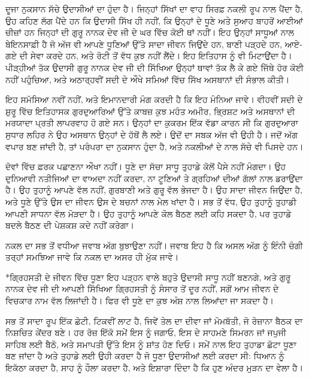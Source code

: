 \documentclass[12pt,a5paper,twoside]{book}  %
\makeatletter
\renewcommand\section{\@startsection{section}{1}{0pt}{1.2em}{0.6em}{\punjabifont\Large\bfseries}}%
\makeatother
\begin{document}
{ਦੂਜਾ ਨੁਕਸਾਨ ਸੱਚੇ ਉਦਾਸੀਆਂ ਦਾ ਹੁੰਦਾ ਹੈ। ਜਿਨ੍ਹਾਂ ਸਿੱਖਾਂ ਦਾ ਵਾਹ ਸਿਰਫ਼ ਨਕਲੀ ਰੂਪ ਨਾਲ ਪੈਂਦਾ ਹੈ, ਉਹ ਕਹਿਣ ਲੱਗ ਪੈਂਦੇ ਹਨ ਕਿ ਉਦਾਸੀ ਸਿੱਖ ਹੀ ਨਹੀਂ, ਕਿ ਉਨ੍ਹਾਂ ਦੇ ਧੂਣੇ ਅਤੇ ਸੁਆਹ ਬਾਹਰੋਂ ਆਈਆਂ ਚੀਜ਼ਾਂ ਹਨ ਜਿਨ੍ਹਾਂ ਦੀ ਗੁਰੂ ਨਾਨਕ ਦੇਵ ਜੀ ਦੇ ਘਰ ਵਿੱਚ ਕੋਈ ਥਾਂ ਨਹੀਂ। ਇਹ ਉਨ੍ਹਾਂ ਸਾਧੂਆਂ ਨਾਲ ਬੇਇਨਸਾਫ਼ੀ ਹੈ ਜੋ ਅੱਜ ਵੀ ਆਪਣੇ ਧੂਣਿਆਂ ਉੱਤੇ ਸਾਦਾ ਜੀਵਨ ਜਿਉਂਦੇ ਹਨ, ਬਾਣੀ ਪੜ੍ਹਦੇ ਹਨ, ਆਏ-ਗਏ ਦੀ ਸੇਵਾ ਕਰਦੇ ਹਨ, ਅਤੇ ਰੋਟੀ ਤੋਂ ਵੱਧ ਕੁਝ ਨਹੀਂ ਲੈਂਦੇ। ਇਹ ਇਤਿਹਾਸ ਨੂੰ ਵੀ ਮਿਟਾਉਂਦਾ ਹੈ। ਪੀੜ੍ਹੀਆਂ ਤੱਕ ਉਦਾਸੀ ਗੁਰੂ ਨਾਨਕ ਦੇਵ ਜੀ ਦੀ ਸਿੱਖਿਆ ਉਨ੍ਹਾਂ ਥਾਵਾਂ ਤੱਕ ਲੈ ਕੇ ਗਏ ਜਿੱਥੇ ਹੋਰ ਕੋਈ ਨਹੀਂ ਪਹੁੰਚਿਆ, ਅਤੇ ਅਠਾਰ੍ਹਵੀਂ ਸਦੀ ਦੇ ਔਖੇ ਸਮਿਆਂ ਵਿੱਚ ਸਿੱਖ ਅਸਥਾਨਾਂ ਦੀ ਸੰਭਾਲ ਕੀਤੀ।

ਇਹ ਸਮੱਸਿਆ ਨਵੀਂ ਨਹੀਂ, ਅਤੇ ਇਮਾਨਦਾਰੀ ਮੰਗ ਕਰਦੀ ਹੈ ਕਿ ਇਹ ਮੰਨਿਆ ਜਾਵੇ। ਵੀਹਵੀਂ ਸਦੀ ਦੇ ਸ਼ੁਰੂ ਵਿੱਚ ਇਤਿਹਾਸਕ ਗੁਰਦੁਆਰਿਆਂ ਉੱਤੇ ਕਾਬਜ਼ ਕੁਝ ਮਹੰਤ ਅਮੀਰ, ਭ੍ਰਿਸ਼ਟ ਅਤੇ ਅਸਥਾਨਾਂ ਦੀ ਮਰਯਾਦਾ ਪ੍ਰਤੀ ਲਾਪਰਵਾਹ ਹੋ ਗਏ ਸਨ। ਉਨ੍ਹਾਂ ਦਾ ਕੁਕਰਮ ਇੱਕ ਵੱਡਾ ਕਾਰਨ ਸੀ ਕਿ ਗੁਰਦੁਆਰਾ ਸੁਧਾਰ ਲਹਿਰ ਨੇ ਉਹ ਅਸਥਾਨ ਉਨ੍ਹਾਂ ਦੇ ਹੱਥੋਂ ਲੈ ਲਏ। ਉਦੋਂ ਦਾ ਸਬਕ ਅੱਜ ਵੀ ਉਹੀ ਹੈ। ਜਦੋਂ ਅੱਗ ਵਪਾਰ ਬਣ ਜਾਂਦੀ ਹੈ, ਤਾਂ ਪਰੰਪਰਾ ਦਾ ਨੁਕਸਾਨ ਹੁੰਦਾ ਹੈ, ਅਤੇ ਨਕਲੀਆਂ ਦੇ ਨਾਲ ਸੱਚੇ ਵੀ ਪਿਸਦੇ ਹਨ।

ਦੋਵਾਂ ਵਿੱਚ ਫ਼ਰਕ ਪਛਾਣਨਾ ਔਖਾ ਨਹੀਂ। ਧੂਣੇ ਦਾ ਸੱਚਾ ਸਾਧੂ ਤੁਹਾਡੇ ਕੋਲੋਂ ਪੈਸੇ ਨਹੀਂ ਮੰਗਦਾ। ਉਹ ਦੁਨਿਆਵੀ ਨਤੀਜਿਆਂ ਦਾ ਵਾਅਦਾ ਨਹੀਂ ਕਰਦਾ, ਨਾ ਟੂਣਿਆਂ ਤੇ ਗ੍ਰਹਿਆਂ ਦੀਆਂ ਗੱਲਾਂ ਨਾਲ ਡਰਾਉਂਦਾ ਹੈ। ਉਹ ਤੁਹਾਨੂੰ ਆਪਣੇ ਵੱਲ ਨਹੀਂ, ਗੁਰਬਾਣੀ ਅਤੇ ਗੁਰੂ ਵੱਲ ਭੇਜਦਾ ਹੈ। ਉਹ ਸਾਦਾ ਜੀਵਨ ਜਿਉਂਦਾ ਹੈ, ਅਤੇ ਧੂਣੇ ਉੱਤੇ ਉਸ ਦਾ ਜੀਵਨ ਉਸ ਦੇ ਬਚਨਾਂ ਨਾਲ ਮੇਲ ਖਾਂਦਾ ਹੈ। ਸਭ ਤੋਂ ਵੱਧ, ਉਹ ਤੁਹਾਨੂੰ ਤੁਹਾਡੀ ਆਪਣੀ ਸਾਧਨਾ ਵੱਲ ਮੋੜਦਾ ਹੈ। ਉਹ ਤੁਹਾਨੂੰ ਆਪਣੇ ਕੋਲ ਬੈਠਣ ਲਈ ਕਹਿ ਸਕਦਾ ਹੈ, ਪਰ ਤੁਹਾਡੇ ਬਦਲੇ ਬੈਠਣ ਦੀ ਪੇਸ਼ਕਸ਼ ਕਦੇ ਨਹੀਂ ਕਰੇਗਾ।

ਨਕਲ ਦਾ ਸਭ ਤੋਂ ਵਧੀਆ ਜਵਾਬ ਅੱਗ ਬੁਝਾਉਣਾ ਨਹੀਂ। ਜਵਾਬ ਇਹ ਹੈ ਕਿ ਅਸਲ ਅੱਗ ਨੂੰ ਇੰਨੀ ਚੰਗੀ ਤਰ੍ਹਾਂ ਸਮਝਿਆ ਜਾਵੇ ਕਿ ਨਕਲ ਦਾ ਅਸਰ ਹੀ ਮੁੱਕ ਜਾਵੇ।


\section*{ਗ੍ਰਿਹਸਤੀ ਦੇ ਜੀਵਨ ਵਿੱਚ ਧੂਣਾ}
ਇਹ ਪੜ੍ਹਨ ਵਾਲੇ ਬਹੁਤੇ ਉਦਾਸੀ ਸਾਧੂ ਨਹੀਂ ਬਣਨਗੇ, ਅਤੇ ਗੁਰੂ ਨਾਨਕ ਦੇਵ ਜੀ ਦੀ ਆਪਣੀ ਸਿੱਖਿਆ ਗ੍ਰਿਹਸਤੀ ਨੂੰ ਸੰਸਾਰ ਤੋਂ ਦੂਰ ਨਹੀਂ, ਸਗੋਂ ਆਮ ਜੀਵਨ ਦੇ ਵਿਚਕਾਰ ਨਾਮ ਵੱਲ ਲਿਜਾਂਦੀ ਹੈ। ਫਿਰ ਵੀ ਧੂਣੇ ਦਾ ਕੁਝ ਅੰਸ਼ ਨਾਲ ਲਿਆਂਦਾ ਜਾ ਸਕਦਾ ਹੈ।

ਸਭ ਤੋਂ ਸਾਦਾ ਰੂਪ ਇੱਕ ਛੋਟੀ, ਟਿਕਵੀਂ ਲਾਟ ਹੈ, ਜਿਵੇਂ ਤੇਲ ਦਾ ਦੀਵਾ ਜਾਂ ਮੋਮਬੱਤੀ, ਜੋ ਰੋਜ਼ਾਨਾ ਬੈਠਕ ਦਾ ਨਿਸ਼ਚਿਤ ਕੇਂਦਰ ਬਣੇ। ਹਰ ਰੋਜ਼ ਇੱਕੋ ਸਮੇਂ ਇਸ ਨੂੰ ਜਗਾਓ, ਇਸ ਦੇ ਸਾਹਮਣੇ ਸਿਮਰਨ ਜਾਂ ਜਪੁਜੀ ਸਾਹਿਬ ਲਈ ਬੈਠੋ, ਅਤੇ ਸਮਾਪਤੀ ਉੱਤੇ ਇਸ ਨੂੰ ਸ਼ਾਂਤ ਹੋਣ ਦਿਓ। ਸਮੇਂ ਨਾਲ ਇਹ ਤੁਹਾਡਾ ਛੋਟਾ ਧੂਣਾ ਬਣ ਜਾਂਦਾ ਹੈ ਅਤੇ ਤੁਹਾਡੇ ਲਈ ਉਹੀ ਕਰਦਾ ਹੈ ਜੋ ਧੂਣਾ ਉਦਾਸੀਆਂ ਲਈ ਕਰਦਾ ਸੀ: ਧਿਆਨ ਨੂੰ ਇਕੱਠਾ ਕਰਦਾ ਹੈ, ਸਾਹ ਨੂੰ ਹੌਲਾ ਕਰਦਾ ਹੈ, ਅਤੇ ਇਸ਼ਾਰਾ ਦਿੰਦਾ ਹੈ ਕਿ ਹੁਣ ਅੰਦਰ ਮੁੜਨ ਦਾ ਵੇਲਾ ਹੈ।

}
\end{document}
